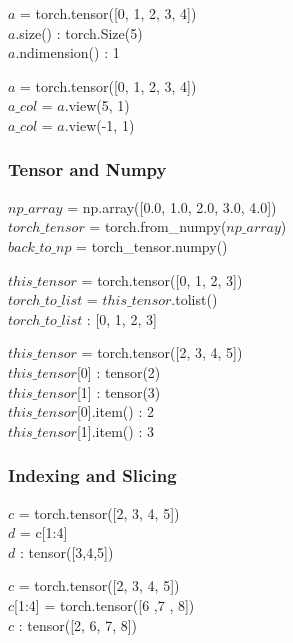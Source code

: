 \documentclass[14 pt]{beamer}
\begin{document}
\begin{frame}
\begin{block}{}
$a$ = torch.tensor([0, 1, 2, 3, 4])\\
$a$.size() : torch.Size(5) \\
$a$.ndimension() : 1
\end{block}
\end{frame}

\begin{frame}
\begin{block}{}
$a$ = torch.tensor([0, 1, 2, 3, 4])\\
$a\_col$ = $a$.view(5, 1) \\
$a\_col$ = $a$.view(-1, 1) 
\end{block}
\end{frame}

\begin{frame}
  \frametitle{Tensor and Numpy }
\begin{block}{}
$np\_array$ = np.array([0.0, 1.0, 2.0, 3.0, 4.0])\\
$torch\_tensor$ = torch.from\_numpy($np\_array$) \\
$back\_to\_np$ = torch\_tensor.numpy()
\end{block}

\begin{block}{}
$this\_tensor$  = torch.tensor([0, 1, 2, 3]) \\
$torch\_to\_list$ = $this\_tensor$.tolist() \\
$torch\_to\_list$ : [0, 1, 2, 3]
\end{block}


\begin{block}{}
$this\_tensor$  = torch.tensor([2, 3, 4, 5]) \\
$this\_tensor$[0] : tensor(2) \\
$this\_tensor$[1] : tensor(3) \\
$this\_tensor$[0].item() : 2 \\
$this\_tensor$[1].item() : 3 
\end{block}
\end{frame}

\begin{frame}
  \frametitle{Indexing and Slicing}
\begin{block}{}
$c$  = torch.tensor([2, 3, 4, 5]) \\
$d$ = c[1:4] \\
$d$ : tensor([3,4,5])
\end{block}
\begin{block}{}
$c$  = torch.tensor([2, 3, 4, 5]) \\
$c$[1:4] = torch.tensor([6 ,7 , 8]) \\
$c$ : tensor([2, 6, 7, 8])
\end{block}
\end{frame}
\end{document}
